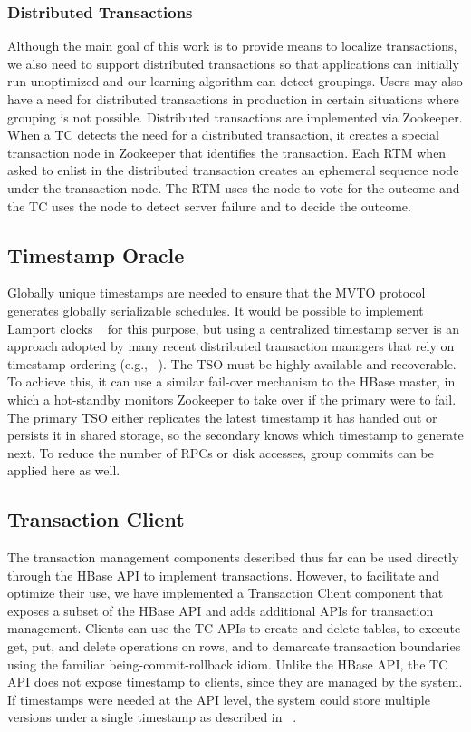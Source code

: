 \documentclass[10pt,final,journal]{IEEEtran}
\begin{document}
\subsubsection{Distributed Transactions}
Although the main goal of this work is to provide means to localize transactions, we also need to support distributed transactions so that applications can initially run unoptimized and our learning algorithm can detect groupings. Users may also have a need for distributed transactions in production in certain situations where grouping is not possible. Distributed transactions are implemented via Zookeeper. When a TC detects the need for a distributed transaction, it creates a special transaction node in Zookeeper that identifies the transaction. Each RTM when asked to enlist in the distributed transaction creates an ephemeral sequence node under the transaction node. The RTM uses the node to vote for the outcome and the TC uses the node to detect server failure and to decide the outcome.

\subsection{Timestamp Oracle}
Globally unique timestamps are needed to ensure that the MVTO protocol generates globally serializable schedules. It would be possible to implement Lamport clocks ~\cite{Lamport:1978:TCO:359545.359563} for this purpose, but using a centralized timestamp server is an approach adopted by many recent distributed transaction managers that rely on timestamp ordering (e.g., ~\cite{Peng:2010:LIP:1924943.1924961, Wei:2011:5740834}). The TSO must be highly available and recoverable. To achieve this, it can use a similar fail-over mechanism to the HBase master, in which a hot-standby monitors Zookeeper to take over if the primary were to fail. The primary TSO either replicates the latest timestamp it has handed out or persists it in shared storage, so the secondary knows which timestamp to generate next. To reduce the number of RPCs or disk accesses, group commits can be applied here as well.

\subsection{Transaction Client}
The transaction management components described thus far can be used directly through the HBase API to implement transactions. However, to facilitate and optimize their use, we have implemented a Transaction Client component that exposes a subset of the HBase API and adds additional APIs for transaction management. Clients can use the TC APIs to create and delete tables, to execute get, put, and delete operations on rows, and to demarcate transaction boundaries using the familiar being-commit-rollback idiom. Unlike the HBase API, the TC API does not expose timestamp to clients, since they are managed by the system. If timestamps were needed at the API level, the system could store multiple versions under a single timestamp as described in ~\cite{Peng:2010:LIP:1924943.1924961}.
\end{document}
